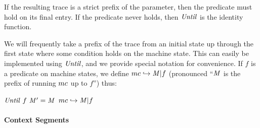 \documentclass[10pt,conference]{ieeetran}%
\theoremstyle{definition}
\begin{document}
If the resulting trace is a strict prefix of the parameter, then the
predicate must hold on its final entry. If the predicate never holds, then
\(\mathit{Until}\) is the identity function.

We will frequently take a prefix of the trace from an initial state up
through the first state where some condition holds on the machine state.
This can easily be implemented using \(\mathit{Until}\), and we provide special notation
for convenience.
%
If \(f\) is a predicate on machine states, we define \(mc
\hookrightarrow \mathit{M} | f\) (pronounced ``\(\mathit{M}\) is the prefix of
running \(mc\) up to \(f\)'') thus:
%
\begin{center}
            {\(\mathit{Until} ~ f ~ \mathit{M}' = \mathit{M}\)}
            {\(mc \hookrightarrow \mathit{M} | f\)}
\end{center}

\paragraph*{Context Segments}
\end{document}
